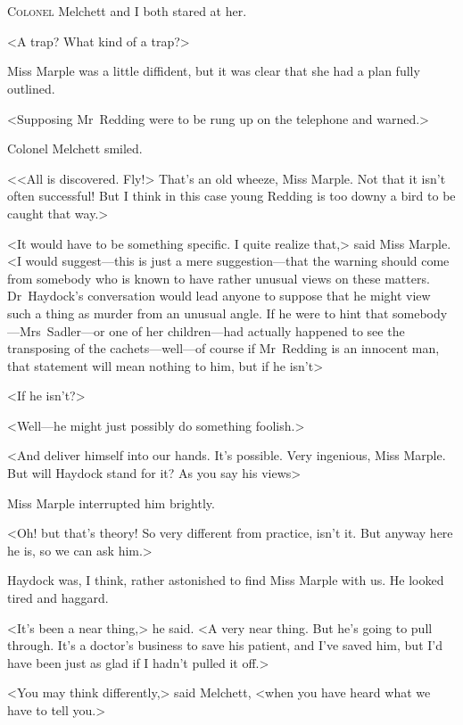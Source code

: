 \chapter[Chapter  \thechapter]{}


\lettrine{C}{olonel} Melchett and I both stared at her.

\zz
<A trap? What kind of a trap?>

\zz
Miss Marple was a little diffident, but it was clear that she had a plan fully outlined.

<Supposing Mr~Redding were to be rung up on the telephone and warned.>

Colonel Melchett smiled.

<<All is discovered. Fly!> That's an old wheeze, Miss Marple. Not that it isn't often successful! But I think in this case young Redding is too downy a bird to be caught that way.>

<It would have to be something specific. I quite realize that,> said Miss Marple. <I would suggest—this is just a mere suggestion—that the warning should come from somebody who is known to have rather unusual views on these matters. Dr~Haydock's conversation would lead anyone to suppose that he might view such a thing as murder from an unusual angle. If he were to hint that somebody—Mrs~Sadler—or one of her children—had actually happened to see the transposing of the cachets—well—of course if Mr~Redding is an innocent man, that statement will mean nothing to him, but if he isn't\longdash>

<If he isn't?>

<Well—he might just possibly do something foolish.>

<And deliver himself into our hands. It's possible. Very ingenious, Miss Marple. But will Haydock stand for it? As you say his views\longdash>

Miss Marple interrupted him brightly.

<Oh! but that's theory! So very different from practice, isn't it. But anyway here he is, so we can ask him.>

Haydock was, I think, rather astonished to find Miss Marple with us. He looked tired and haggard.

<It's been a near thing,> he said. <A very near thing. But he's going to pull through. It's a doctor's business to save his patient, and I've saved him, but I'd have been just as glad if I hadn't pulled it off.>

<You may think differently,> said Melchett, <when you have heard what we have to tell you.>

